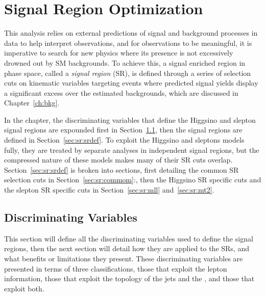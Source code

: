 \chapter{Signal Region Optimization}
 \label{ch:sr}
This analysis relies on external predictions of signal and background processes in data to help interpret observations, and for observations to be meaningful, it is imperative to search for new physics where its presence is not excessively drowned out by SM backgrounds.  To achieve this, a signal enriched region in phase space, called a \textit{signal region} (SR), is defined through a series of selection cuts on kinematic variables targeting events where predicted signal yields display a significant excess over the estimated backgrounds, which are discussed in Chapter~\ref{ch:bkg}.   
 
 In the chapter, the discriminating variables that define the Higgsino and slepton signal regions are expounded first in Section~\ref{sec:sr:discvar}, then the signal regions are defined in Section~\ref{sec:sr:srdef}.  To exploit the Higgsino and sleptons models fully, they are treated by separate analyses in independent signal regions, but the compressed nature of these models makes many of their SR cuts overlap.  Section~\ref{sec:sr:srdef} is broken into sections, first detailing the common SR selection cuts in Section~\ref{sec:sr:commom}:, then the Higgsino SR specific cuts and the slepton SR specific cuts in Section~\ref{sec:sr:mll} and~\ref{sec:sr:mt2}. 
 
\section{Discriminating Variables}
\label{sec:sr:discvar}
This section will define all the discriminating variables used to define the signal regions, then the next section will detail how they are applied to the SRs, and what benefits or limitations they present.  These discriminating variables are presented in terms of three classifications, those that exploit the lepton information, those that exploit the topology of the jets and the \met{}, and those that exploit both.  

